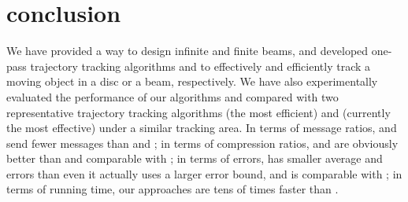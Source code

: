 
\section{conclusion}
\label{sec-conclusion}

We have provided a way to design infinite and finite beams, and developed one-pass trajectory tracking algorithms \citt and \bitt to effectively and efficiently track a moving object in a disc or a beam, respectively.
We have also experimentally evaluated the performance of our algorithms \citt and \bitt compared with two representative trajectory tracking algorithms \ldrh (the most efficient) and \grts (currently the most effective) under a similar tracking area. 
In terms of message ratios, \citt and \bitt send fewer messages than \grts and \ldrh; in terms of compression ratios, \citt and \bitt are obviously better than \ldrh and comparable with \grts; in terms of errors, \bitt has smaller average \ped and \sed errors than \grts even it actually uses a larger \sed error bound, and \citt is comparable with \grts; in terms of running time, our approaches are tens of times faster than \grts.
